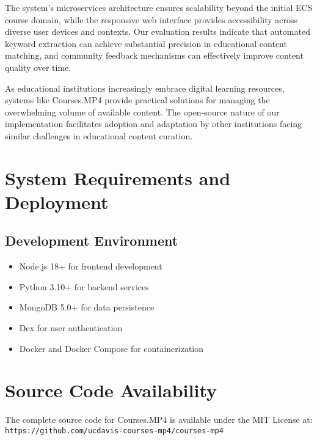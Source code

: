 \documentclass[manuscript,nonacm]{acmart}
\begin{document}
The system's microservices architecture ensures scalability beyond the initial ECS course domain, while the responsive web interface provides accessibility across diverse user devices and contexts. Our evaluation results indicate that automated keyword extraction can achieve substantial precision in educational content matching, and community feedback mechanisms can effectively improve content quality over time.

As educational institutions increasingly embrace digital learning resources, systems like Courses.MP4 provide practical solutions for managing the overwhelming volume of available content. The open-source nature of our implementation facilitates adoption and adaptation by other institutions facing similar challenges in educational content curation.






\appendix

\section{System Requirements and Deployment}

\subsection{Development Environment}
\begin{itemize}
    \item Node.js 18+ for frontend development
    \item Python 3.10+ for backend services
    \item MongoDB 5.0+ for data persistence
    \item Dex for user authentication
    \item Docker and Docker Compose for containerization
\end{itemize}

\section{Source Code Availability}
The complete source code for Courses.MP4 is available under the MIT License at:
\newline
\texttt{https://github.com/ucdavis-courses-mp4/courses-mp4}
\end{document}
